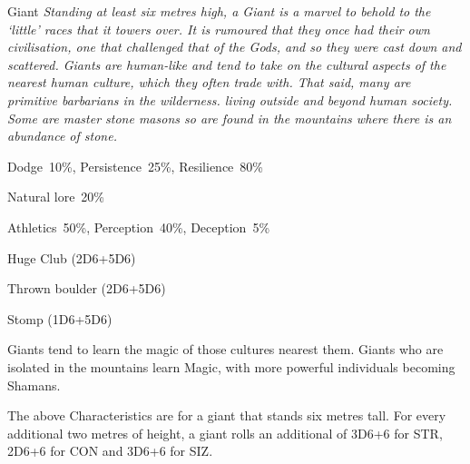 \begin{monsterbox}{Giant}
	\textit{Standing at least six metres high, a Giant is a marvel to behold to the ‘little’ races that it towers over. It is rumoured that they once had their own civilisation, one that challenged that of the Gods, and so they were cast down and scattered. Giants are human-like and tend to take on the cultural aspects of the nearest human culture, which they often trade with. That said, many are primitive barbarians in the wilderness. living outside and beyond human society. Some are master stone masons so are found in the mountains where there is an abundance of stone. }\\
	\rpghline
	\basics[%
        hitpoints  = 44,
	majorwound = 22,
	damagemodifier = +5D6,
	powerpoints = 11,
	movementrate = 30m,
	armor = Tough Hide (3AP),
	plunderrating = 1-5
	]
	\rpghline%
	\stats[ %
		STR = 9D6+18 (49),
		CON = 6D6+18 (39),
		DEX = 2D6+3  (10),
		SIZ = 9D6+18 (49),
		INT = 3D6    (11),
		POW = 3D6    (11),
		CHA = 2D6    (7)
	]
	\rpghline%
	\begin{rpg-monsteraction}[Resistances]
		Dodge~10\%, Persistence~25\%, Resilience~80\%
	\end{rpg-monsteraction}
	\begin{rpg-monsteraction}[Knowledge]
    		Natural lore~20\%
	\end{rpg-monsteraction}
	\begin{rpg-monsteraction}[Practical]
		Athletics~50\%, Perception~40\%, Deception~5\%
	\end{rpg-monsteraction}
	\begin{rpg-monsteraction}
		Huge Club (2D6+5D6)
	\end{rpg-monsteraction}
	\begin{rpg-monsteraction}
		Thrown boulder (2D6+5D6)
	\end{rpg-monsteraction}
	\begin{rpg-monsteraction}
		Stomp (1D6+5D6)
	\end{rpg-monsteraction}
	\begin{rpg-monsteraction}[Supernatural]
		Giants tend to learn the magic of those cultures nearest them. Giants who are isolated in the mountains learn Magic, with more powerful individuals becoming Shamans.
	\end{rpg-monsteraction}
	\begin{rpg-monsteraction}
		The above Characteristics are for a giant that stands six metres tall. For every additional two metres of height, a giant rolls an additional of 3D6+6 for STR, 2D6+6 for CON and 3D6+6 for SIZ.
	\end{rpg-monsteraction}
\end{monsterbox}

